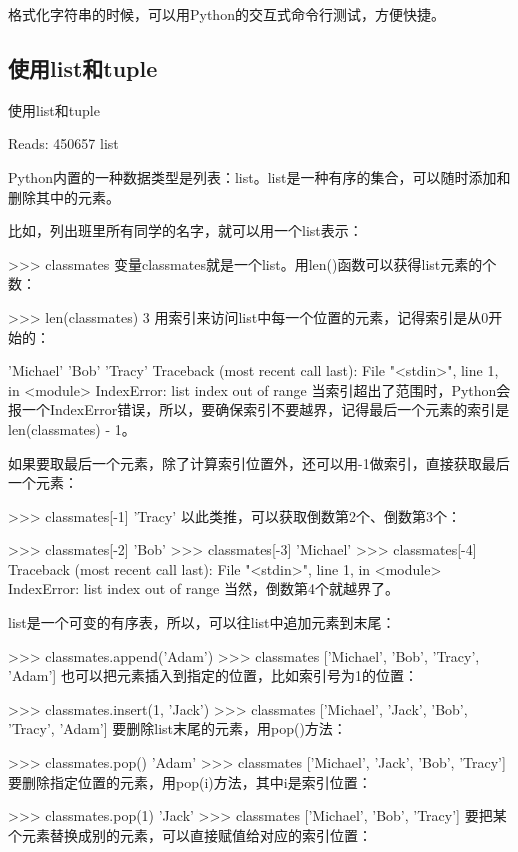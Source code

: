 \documentclass[10pt,a4paper]{ctexbook}
\begin{document}
格式化字符串的时候，可以用Python的交互式命令行测试，方便快捷。


\subsection{使用list和tuple}

使用list和tuple

Reads: 450657
list

Python内置的一种数据类型是列表：list。list是一种有序的集合，可以随时添加和删除其中的元素。

比如，列出班里所有同学的名字，就可以用一个list表示：

>>> classmates
变量classmates就是一个list。用len()函数可以获得list元素的个数：

>>> len(classmates)
3
用索引来访问list中每一个位置的元素，记得索引是从0开始的：

'Michael'
'Bob'
'Tracy'
Traceback (most recent call last):
  File "<stdin>", line 1, in <module>
IndexError: list index out of range
当索引超出了范围时，Python会报一个IndexError错误，所以，要确保索引不要越界，记得最后一个元素的索引是len(classmates) - 1。

如果要取最后一个元素，除了计算索引位置外，还可以用-1做索引，直接获取最后一个元素：

>>> classmates[-1]
'Tracy'
以此类推，可以获取倒数第2个、倒数第3个：

>>> classmates[-2]
'Bob'
>>> classmates[-3]
'Michael'
>>> classmates[-4]
Traceback (most recent call last):
  File "<stdin>", line 1, in <module>
IndexError: list index out of range
当然，倒数第4个就越界了。

list是一个可变的有序表，所以，可以往list中追加元素到末尾：

>>> classmates.append('Adam')
>>> classmates
['Michael', 'Bob', 'Tracy', 'Adam']
也可以把元素插入到指定的位置，比如索引号为1的位置：

>>> classmates.insert(1, 'Jack')
>>> classmates
['Michael', 'Jack', 'Bob', 'Tracy', 'Adam']
要删除list末尾的元素，用pop()方法：

>>> classmates.pop()
'Adam'
>>> classmates
['Michael', 'Jack', 'Bob', 'Tracy']
要删除指定位置的元素，用pop(i)方法，其中i是索引位置：

>>> classmates.pop(1)
'Jack'
>>> classmates
['Michael', 'Bob', 'Tracy']
要把某个元素替换成别的元素，可以直接赋值给对应的索引位置：
\end{document}
